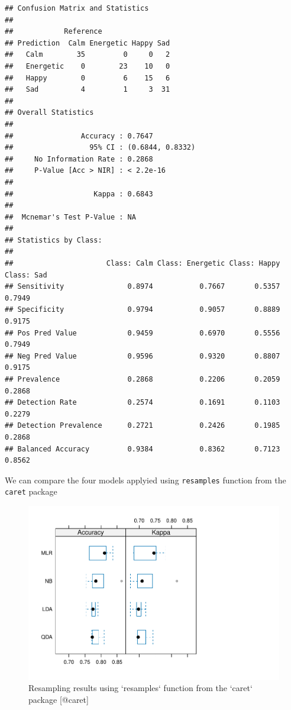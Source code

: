 \documentclass[11pt,]{article}
\begin{document}
\begin{verbatim}
## Confusion Matrix and Statistics
## 
##            Reference
## Prediction  Calm Energetic Happy Sad
##   Calm        35         0     0   2
##   Energetic    0        23    10   0
##   Happy        0         6    15   6
##   Sad          4         1     3  31
## 
## Overall Statistics
##                                           
##                Accuracy : 0.7647          
##                  95% CI : (0.6844, 0.8332)
##     No Information Rate : 0.2868          
##     P-Value [Acc > NIR] : < 2.2e-16       
##                                           
##                   Kappa : 0.6843          
##                                           
##  Mcnemar's Test P-Value : NA              
## 
## Statistics by Class:
## 
##                      Class: Calm Class: Energetic Class: Happy Class: Sad
## Sensitivity               0.8974           0.7667       0.5357     0.7949
## Specificity               0.9794           0.9057       0.8889     0.9175
## Pos Pred Value            0.9459           0.6970       0.5556     0.7949
## Neg Pred Value            0.9596           0.9320       0.8807     0.9175
## Prevalence                0.2868           0.2206       0.2059     0.2868
## Detection Rate            0.2574           0.1691       0.1103     0.2279
## Detection Prevalence      0.2721           0.2426       0.1985     0.2868
## Balanced Accuracy         0.9384           0.8362       0.7123     0.8562
\end{verbatim}

We can compare the four models applyied using \texttt{resamples}
function from the \texttt{caret} package \citep{caret}

\begin{figure}[H]
\includegraphics{figs/resamp} \caption{Resampling results using `resamples` function from the `caret` package [@caret] }\label{fig:resamp}
\end{figure}
\end{document}
